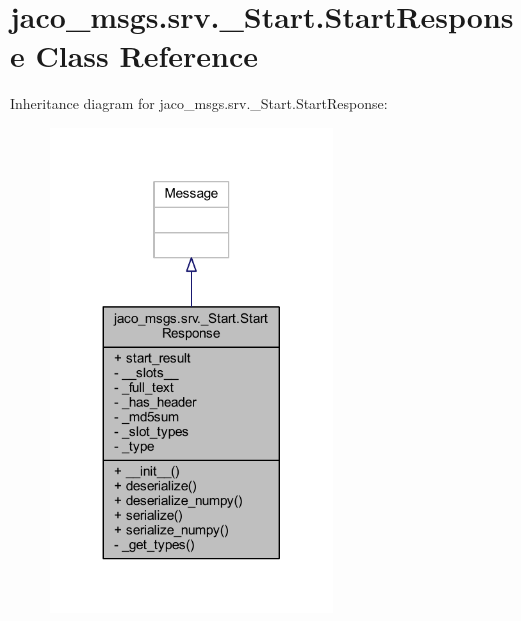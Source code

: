 \hypertarget{classjaco__msgs_1_1srv_1_1__Start_1_1StartResponse}{}\section{jaco\+\_\+msgs.\+srv.\+\_\+\+Start.\+Start\+Response Class Reference}
\label{classjaco__msgs_1_1srv_1_1__Start_1_1StartResponse}


Inheritance diagram for jaco\+\_\+msgs.\+srv.\+\_\+\+Start.\+Start\+Response\+:
\nopagebreak
\begin{figure}[H]
\begin{center}
\leavevmode
\includegraphics[width=212pt]{d2/d4b/classjaco__msgs_1_1srv_1_1__Start_1_1StartResponse__inherit__graph}
\end{center}
\end{figure}


